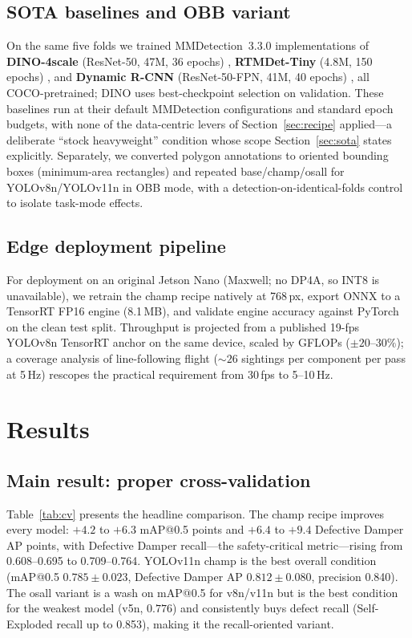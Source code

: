 \documentclass[conference]{IEEEtran}
\makeatletter
\newcommand{\dd}{Defective Damper}
\newcommand{\map}{mAP@0.5}
\makeatother
\begin{document}
\subsection{SOTA baselines and OBB variant}
On the same five folds we trained MMDetection~3.3.0 \cite{chen2019mmdetection} implementations of \textbf{DINO-4scale} (ResNet-50, 47M, 36 epochs) \cite{zhang2023dino}, \textbf{RTMDet-Tiny} (4.8M, 150 epochs) \cite{lyu2022rtmdet}, and \textbf{Dynamic R-CNN} (ResNet-50-FPN, 41M, 40 epochs) \cite{zhang2020dynamicrcnn}, all COCO-pretrained; DINO uses best-checkpoint selection on validation. These baselines run at their default MMDetection configurations and standard epoch budgets, with none of the data-centric levers of Section~\ref{sec:recipe} applied---a deliberate ``stock heavyweight'' condition whose scope Section~\ref{sec:sota} states explicitly. Separately, we converted polygon annotations to oriented bounding boxes (minimum-area rectangles) and repeated base/champ/osall for YOLOv8n/YOLOv11n in OBB mode, with a detection-on-identical-folds control to isolate task-mode effects.

\subsection{Edge deployment pipeline}
\label{sec:edgemethods}
For deployment on an original Jetson Nano (Maxwell; no DP4A, so INT8 is unavailable), we retrain the champ recipe natively at 768\,px, export ONNX to a TensorRT FP16 engine (8.1\,MB), and validate engine accuracy against PyTorch on the clean test split. Throughput is projected from a published 19-fps YOLOv8n TensorRT anchor on the same device, scaled by GFLOPs (${\pm}20$--$30\%$); a coverage analysis of line-following flight (${\sim}26$ sightings per component per pass at 5\,Hz) rescopes the practical requirement from 30\,fps to 5--10\,Hz.

\section{Results}
\label{sec:results}

\subsection{Main result: proper cross-validation}
\label{sec:main}
Table~\ref{tab:cv} presents the headline comparison. The champ recipe improves every model: $+4.2$ to $+6.3$ \map{} points and $+6.4$ to $+9.4$ \dd{} AP points, with \dd{} recall---the safety-critical metric---rising from 0.608--0.695 to 0.709--0.764. YOLOv11n champ is the best overall condition (\map{} $0.785\pm0.023$, \dd{} AP $0.812\pm0.080$, precision 0.840). The osall variant is a wash on \map{} for v8n/v11n but is the best condition for the weakest model (v5n, $0.776$) and consistently buys defect recall (Self-Exploded recall up to 0.853), making it the recall-oriented variant.
\end{document}
